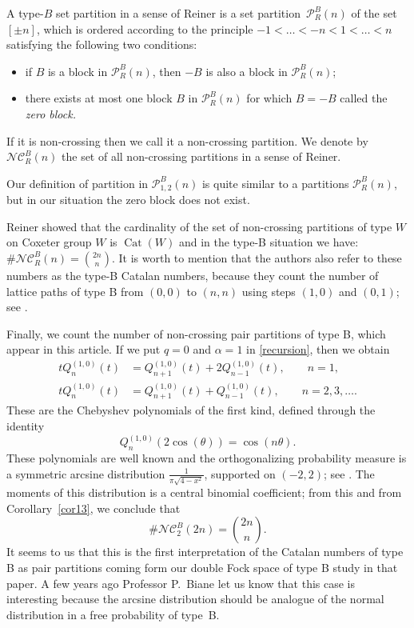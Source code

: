 \documentclass[pdftex]{sigma}
\numberwithin{equation}{section}
\def\P{\mathcal{P}}
\def\NC{\mathcal{NC}}
\newcommand{\q}{q}
\newcommand{\s}{\alpha}%
\begin{document}
\begin{Definition}
A type-$B$ set partition in a sense of Reiner \cite[Section 2]{Reiner1997} is a set partition~$\P_R^{B}(n) $ %
of the set $[\pm n]$, which is ordered according to the principle $-1<\dots<-n<1<\dots<n$ satisfying the following two conditions:
\begin{itemize}\itemsep=0pt
\item if $B$ is a block in $\P_R^{B}(n)$, then $-B$ is also a block in $\P_R^{B}(n)$;
\item there exists at most one block $B$ in $\P_R^{B}(n)$ for which $B =-B$ called the \emph{zero block.}
\end{itemize}
If it is non-crossing then we call it a non-crossing partition. We denote by $\NC^{B}_R(n)$ the set of all non-crossing partitions in a sense of Reiner.
\end{Definition}

Our definition of partition in $\P_{1,2}^{B}(n)$ is quite similar to a partitions $\P_R^{B}(n)$, but in our situation the zero block does not exist.

Reiner \cite{Reiner1997} showed that
the cardinality of the set of non-crossing partitions of type $W$ on Coxeter group $W$ is $\operatorname{Cat}(W)$ and in the type-B situation we have:
$\#\NC^{{B}}_R(n)={{2n}\choose{n}}$.
It is worth to mention that the authors also refer to these numbers as the type-B Catalan numbers, because they count the number of lattice paths of type B from $(0,0)$ to $(n,n)$ using steps $(1,0)$ and $(0,1)$; see \cite{Stump2008, Stump2010}.

Finally, we count the number of non-crossing pair partitions of type B, which appear in this article. If we put $\q=0$ and $\s=1 $ in \eqref{recursion}, then we obtain
\begin{align*}
t Q_n^{(1, 0)}(t) &= Q_{n+1}^{(1, 0)}(t) +2Q_{n-1}^{(1, 0)}(t) , \qquad n=1,
\\ t Q_n^{(1, 0)}(t) &= Q_{n+1}^{(1, 0)}(t) +Q_{n-1}^{(1, 0)}(t), \qquad n=2,3,\dots.
\end{align*}
These are the Chebyshev polynomials of the first kind, defined through the identity \[Q_{n}^{(1, 0)}(2\cos(\theta))=\cos(n\theta).\]
These polynomials are well known and the orthogonalizing probability measure is a symmetric arcsine distribution $\frac{1}{\pi \sqrt{4-x^2}}$, supported on $(-2, 2)$; see \cite[p.~39]{HoraObata}. The moments of this distribution is a central binomial coefficient; from this and from Corollary~\ref{cor13}, we conclude that
\[
\#\NC_2^B(2 n)={{2n}\choose{n}}.
\]
It seems to us that this is the first interpretation of the Catalan numbers of type B
as pair partitions coming form our double Fock space of type B study in that paper. A few years ago Professor P.~Biane let us know that this case is interesting
because the arcsine distribution should be analogue of the normal distribution in a free probability of type~B.
\end{document}
